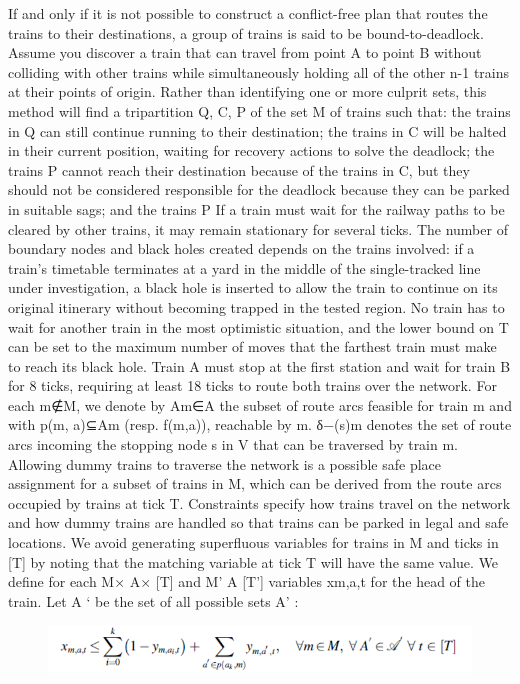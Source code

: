 \documentclass[sigplan,screen]{acmart}
\begin{document}
If and only if it is not possible to construct a conflict-free plan that routes the trains to their destinations, a group of trains is said to be bound-to-deadlock. Assume you discover a train that can travel from point A to point B without colliding with other trains while simultaneously holding all of the other n-1 trains at their points of origin. Rather than identifying one or more culprit sets, this method will find a tripartition Q, C, P of the set M of trains such that: the trains in Q can still continue running to their destination; the trains in C will be halted in their current position, waiting for recovery actions to solve the deadlock; the trains P cannot reach their destination because of the trains in C, but they should not be considered responsible for the deadlock because they can be parked in suitable sags; and the trains P If a train must wait for the railway paths to be cleared by other trains, it may remain stationary for several ticks. The number of boundary nodes and black holes created depends on the trains involved: if a train's timetable terminates at a yard in the middle of the single-tracked line under investigation, a black hole is inserted to allow the train to continue on its original itinerary without becoming trapped in the tested region. No train has to wait for another train in the most optimistic situation, and the lower bound on T can be set to the maximum number of moves that the farthest train must make to reach its black hole. Train A must stop at the first station and wait for train B for 8 ticks, requiring at least 18 ticks to route both trains over the network. For each m∉M, we denote by Am∈A the subset of route arcs feasible for train m and with p(m, a)⊆Am (resp. f(m,a)), reachable by m. δ−(s)m denotes the set of route arcs incoming the stopping node s in V that can be traversed by train m. Allowing dummy trains to traverse the network is a possible safe place assignment for a subset of trains in M, which can be derived from the route arcs occupied by trains at tick T. Constraints specify how trains travel on the network and how dummy trains are handled so that trains can be parked in legal and safe locations. We avoid generating superfluous variables for trains in M and ticks in [T] by noting that the matching variable at tick T will have the same value. We define for each M× A× [T] and M' A [T'] variables xm,a,t for the head of the train. Let A ‘ be the set of all possible sets A’ : 
\begin{figure}
    \centering
    \includegraphics[width=\linewidth]{1.png}
\end{figure}
\end{document}

